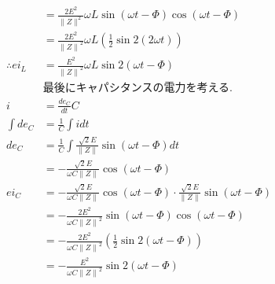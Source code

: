 \documentclass[twocolumn]{article}
\begin{document}
\begin{enumerate}
\begin{align*}
                          & = \frac{2E^2}{{\|Z\|^2}}\omega L \sin \left(\omega t - \Phi\right) \cos \left(\omega t - \Phi\right)                                \\
                          & = \frac{2E^2}{{\|Z\|}^2}\omega L \left(\frac{1}{2}\sin2\left(2\omega t\right)\right)                                                \\
          \therefore ei_L & = \frac{E^2}{{\|Z\|}^2}\omega L \sin2\left(\omega t - \Phi\right)                                                                   \\
                          & \text{最後にキャパシタンスの電力を考える.}                                                                                                           \\
          i               & = \frac{de_C}{dt}C                                                                                                                  \\
          \int de_C       & = \frac{1}{C} \int i dt                                                                                                             \\
          de_C            & = \frac{1}{C} \int \frac{\sqrt{2}E}{\|Z\|}\sin \left(\omega t - \Phi\right) dt                                                      \\
                          & = -\frac{\sqrt{2}E}{\omega C \|Z\|}\cos\left(\omega t - \Phi\right)                                                                 \\
          ei_C            & = -\frac{\sqrt{2}E}{\omega C \|Z\|}\cos\left(\omega t - \Phi\right) \cdot \frac{\sqrt{2}E}{\|Z\|}\sin \left(\omega t - \Phi\right)  \\
                          & = -\frac{2E^2}{\omega C {\|Z\|}^2}\sin\left(\omega t - \Phi\right) \cos \left(\omega t - \Phi\right)                                \\
                          & = -\frac{2E^2}{\omega C {\|Z\|}^2} \left(\frac{1}{2} \sin2\left(\omega t - \Phi\right)\right)                                       \\
                          & = -\frac{E^2}{\omega C {\|Z\|}^2}\sin2\left(\omega t -\Phi\right)                                                                   \\
        \end{align*}


\end{enumerate}
\end{document}
